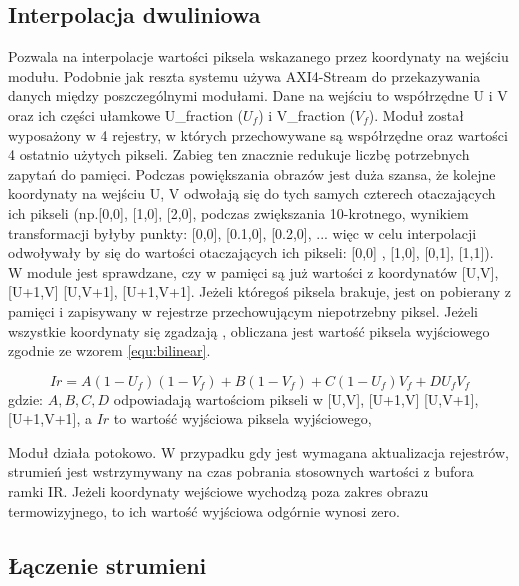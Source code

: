 \subsection{Interpolacja dwuliniowa} %
Pozwala na interpolacje wartości piksela wskazanego przez koordynaty na wejściu modułu.
Podobnie jak reszta systemu używa AXI4-Stream do przekazywania danych między poszczególnymi modułami. 
Dane na wejściu to współrzędne U i V oraz ich części ułamkowe U\_fraction ($U_f$) i V\_fraction ($V_f$). 
Moduł został wyposażony w 4 rejestry, w których przechowywane są współrzędne oraz wartości 4 ostatnio użytych pikseli. 
Zabieg ten znacznie redukuje liczbę potrzebnych zapytań do pamięci. 
Podczas powiększania obrazów jest duża szansa, że kolejne koordynaty na wejściu U, V odwołają się do tych samych czterech otaczających ich pikseli (np.[0,0], [1,0], [2,0],  podczas zwiększania 10-krotnego, wynikiem transformacji byłyby punkty: [0,0], [0.1,0], [0.2,0], ... więc w celu interpolacji odwoływały by się do wartości otaczających ich pikseli: [0,0] , [1,0], [0,1], [1,1]). 
W module jest sprawdzane, czy w pamięci są już wartości z koordynatów [U,V], [U+1,V] [U,V+1], [U+1,V+1]. 
Jeżeli któregoś piksela brakuje, jest on pobierany z pamięci i zapisywany w rejestrze przechowującym niepotrzebny piksel. 
Jeżeli wszystkie koordynaty się zgadzają , obliczana jest wartość piksela wyjściowego zgodnie ze wzorem \eqref{equ:bilinear}.  

\begin{equation}\label{equ:bilinear}
Ir = A(1-U_{f})(1-V_{f})+B(1-V_{f})+C(1- U_{f})V_{f}+ D U_{f} V_{f}
\end{equation}
\noindent gdzie: $ A, B, C ,D $ odpowiadają wartościom pikseli w [U,V], [U+1,V] [U,V+1], [U+1,V+1], a $ Ir $ to wartość wyjściowa piksela wyjściowego, %

Moduł działa potokowo. W przypadku gdy jest wymagana aktualizacja rejestrów, strumień jest wstrzymywany na czas pobrania stosownych wartości z bufora ramki IR. Jeżeli koordynaty wejściowe wychodzą poza zakres obrazu termowizyjnego, to ich wartość wyjściowa odgórnie wynosi zero.

\subsection{Łączenie strumieni}

